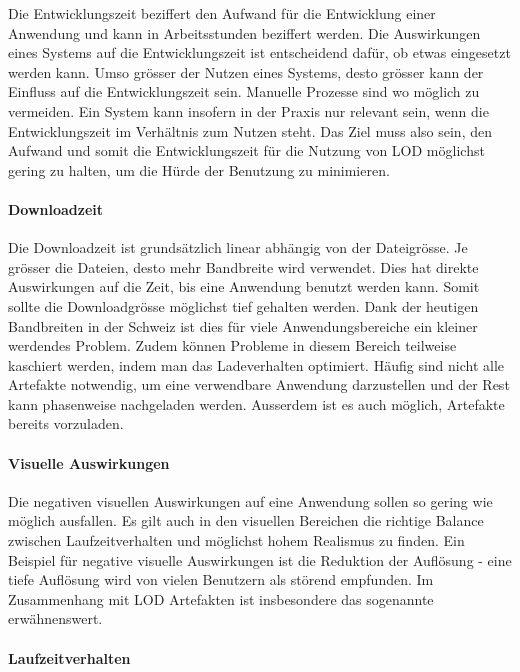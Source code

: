 Die Entwicklungszeit beziffert den Aufwand für die Entwicklung einer Anwendung und kann in Arbeitsstunden beziffert werden.
Die Auswirkungen eines Systems auf die Entwicklungszeit ist entscheidend dafür, ob etwas eingesetzt werden kann. Umso grösser der Nutzen eines Systems, desto grösser kann der Einfluss auf die Entwicklungszeit sein. Manuelle Prozesse sind wo möglich zu vermeiden. Ein System kann insofern in der Praxis nur relevant sein, wenn die Entwicklungszeit im Verhältnis zum Nutzen steht. Das Ziel muss also sein, den Aufwand und somit die Entwicklungszeit für die Nutzung von LOD möglichst gering zu halten, um die Hürde der Benutzung zu minimieren.

\paragraph{Downloadzeit}

Die Downloadzeit ist grundsätzlich linear abhängig von der Dateigrösse.
Je grösser die Dateien, desto mehr Bandbreite wird verwendet. Dies hat direkte Auswirkungen auf die Zeit, bis eine Anwendung benutzt werden kann. Somit sollte die Downloadgrösse möglichst tief gehalten werden.
Dank der heutigen Bandbreiten in der Schweiz ist dies für viele Anwendungsbereiche ein kleiner werdendes Problem. 
Zudem können Probleme in diesem Bereich teilweise kaschiert werden, indem man das Ladeverhalten optimiert. Häufig sind nicht alle Artefakte notwendig, um eine verwendbare Anwendung darzustellen und der Rest kann phasenweise nachgeladen werden.
Ausserdem ist es auch möglich, Artefakte bereits vorzuladen.

\paragraph{Visuelle Auswirkungen}

Die negativen visuellen Auswirkungen auf eine Anwendung sollen so gering wie möglich ausfallen. Es gilt auch in den visuellen Bereichen die richtige Balance zwischen Laufzeitverhalten und möglichst hohem Realismus zu finden. Ein Beispiel für negative visuelle Auswirkungen ist die Reduktion der Auflösung - eine tiefe Auflösung wird von vielen Benutzern als störend empfunden. Im Zusammenhang mit LOD Artefakten ist insbesondere das sogenannte  erwähnenswert.

\paragraph{Laufzeitverhalten}

